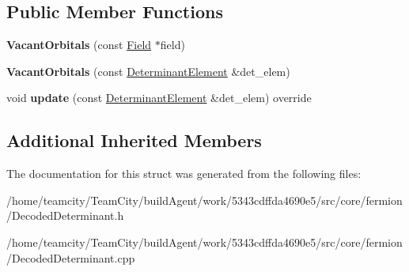 \subsection*{Public Member Functions}
\begin{DoxyCompactItemize}
\item 
{\bfseries Vacant\+Orbitals} (const \hyperlink{classField}{Field} $\ast$field)\hypertarget{structVacantOrbitals_abc2ee60690871c15227160b74329360e}{}\label{structVacantOrbitals_abc2ee60690871c15227160b74329360e}

\item 
{\bfseries Vacant\+Orbitals} (const \hyperlink{classDeterminantElement}{Determinant\+Element} \&det\+\_\+elem)\hypertarget{structVacantOrbitals_a4fd0fd14cc4f4c289027c0e58eb533ad}{}\label{structVacantOrbitals_a4fd0fd14cc4f4c289027c0e58eb533ad}

\item 
void {\bfseries update} (const \hyperlink{classDeterminantElement}{Determinant\+Element} \&det\+\_\+elem) override\hypertarget{structVacantOrbitals_a3c0f8eb12c0351379db87c93c615c96d}{}\label{structVacantOrbitals_a3c0f8eb12c0351379db87c93c615c96d}

\end{DoxyCompactItemize}
\subsection*{Additional Inherited Members}


The documentation for this struct was generated from the following files\+:\begin{DoxyCompactItemize}
\item 
/home/teamcity/\+Team\+City/build\+Agent/work/5343cdffda4690e5/src/core/fermion/Decoded\+Determinant.\+h\item 
/home/teamcity/\+Team\+City/build\+Agent/work/5343cdffda4690e5/src/core/fermion/Decoded\+Determinant.\+cpp\end{DoxyCompactItemize}
